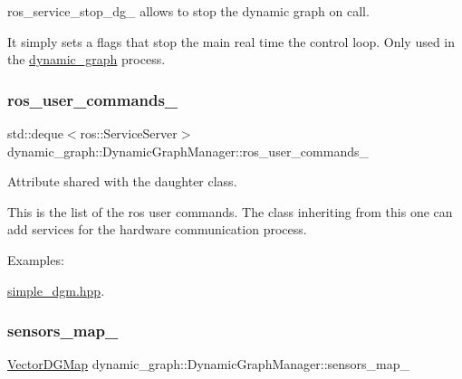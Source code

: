 ros\+\_\+service\+\_\+stop\+\_\+dg\+\_\+ allows to stop the dynamic graph on call. 

It simply sets a flags that stop the main real time the control loop. Only used in the \hyperlink{namespacedynamic__graph}{dynamic\+\_\+graph} process. \mbox{\label{classdynamic__graph_1_1DynamicGraphManager_a0fb35bc44f331db3570c09b75b49cd15}} 
\subsubsection{\texorpdfstring{ros\+\_\+user\+\_\+commands\+\_\+}{ros\_user\_commands\_}}
{\footnotesize\ttfamily std\+::deque$<$ros\+::\+Service\+Server$>$ dynamic\+\_\+graph\+::\+Dynamic\+Graph\+Manager\+::ros\+\_\+user\+\_\+commands\+\_\+\hspace{0.3cm}{\ttfamily [protected]}}



Attribute shared with the daughter class. 

This is the list of the ros user commands. The class inheriting from this one can add services for the hardware communication process. \begin{Desc}
\item[Examples\+: ]\par
\hyperlink{simple_dgm_8hpp-example}{simple\+\_\+dgm.\+hpp}.\end{Desc}
\mbox{\label{classdynamic__graph_1_1DynamicGraphManager_a896bf6cb22d2d88a5a6a307a2e44608e}} 
\subsubsection{\texorpdfstring{sensors\+\_\+map\+\_\+}{sensors\_map\_}}
{\footnotesize\ttfamily \hyperlink{namespacedynamic__graph_a51212ed7fa4ae81e7b362a27f09b7ab8}{Vector\+D\+G\+Map} dynamic\+\_\+graph\+::\+Dynamic\+Graph\+Manager\+::sensors\+\_\+map\+\_\+\hspace{0.3cm}{\ttfamily [protected]}}



